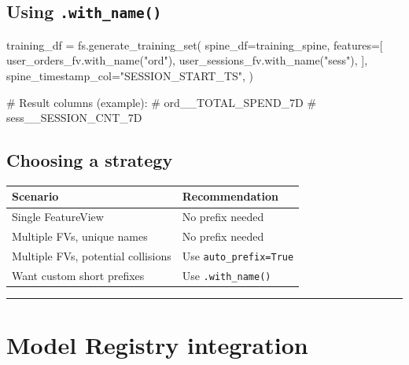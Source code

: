 \documentclass[
  letterpaper,
  DIV=11,
  numbers=noendperiod]{scrreprt}
\newenvironment{Shaded}{\begin{snugshade}}{\end{snugshade}}
\newcommand{\CommentTok}[1]{\textcolor[rgb]{0.37,0.37,0.37}{#1}}
\newcommand{\NormalTok}[1]{\textcolor[rgb]{0.00,0.23,0.31}{#1}}
\newcommand{\OperatorTok}[1]{\textcolor[rgb]{0.37,0.37,0.37}{#1}}
\newcommand{\StringTok}[1]{\textcolor[rgb]{0.13,0.47,0.30}{#1}}
\begin{document}
\hypertarget{using-.with_name}{%
\subsection{\texorpdfstring{Using
\texttt{.with\_name()}}{Using .with\_name()}}\label{using-.with_name}}

\begin{Shaded}
\begin{Highlighting}[]
\NormalTok{training\_df }\OperatorTok{=}\NormalTok{ fs.generate\_training\_set(}
\NormalTok{    spine\_df}\OperatorTok{=}\NormalTok{training\_spine,}
\NormalTok{    features}\OperatorTok{=}\NormalTok{[}
\NormalTok{        user\_orders\_fv.with\_name(}\StringTok{"ord"}\NormalTok{),}
\NormalTok{        user\_sessions\_fv.with\_name(}\StringTok{"sess"}\NormalTok{),}
\NormalTok{    ],}
\NormalTok{    spine\_timestamp\_col}\OperatorTok{=}\StringTok{"SESSION\_START\_TS"}\NormalTok{,}
\NormalTok{)}

\CommentTok{\# Result columns (example):}
\CommentTok{\# ord\_\_TOTAL\_SPEND\_7D}
\CommentTok{\# sess\_\_SESSION\_CNT\_7D}
\end{Highlighting}
\end{Shaded}

\hypertarget{choosing-a-strategy}{%
\subsection{Choosing a strategy}\label{choosing-a-strategy}}

\begin{longtable}[]{@{}ll@{}}
\toprule\noalign{}
Scenario & Recommendation \\
\midrule\noalign{}
\endhead
\bottomrule\noalign{}
\endlastfoot
Single FeatureView & No prefix needed \\
Multiple FVs, unique names & No prefix needed \\
Multiple FVs, potential collisions & Use \texttt{auto\_prefix=True} \\
Want custom short prefixes & Use \texttt{.with\_name()} \\
\end{longtable}

\begin{center}\rule{0.5\linewidth}{0.5pt}\end{center}

\hypertarget{model-registry-integration}{%
\section{Model Registry integration}\label{model-registry-integration}}
\end{document}
